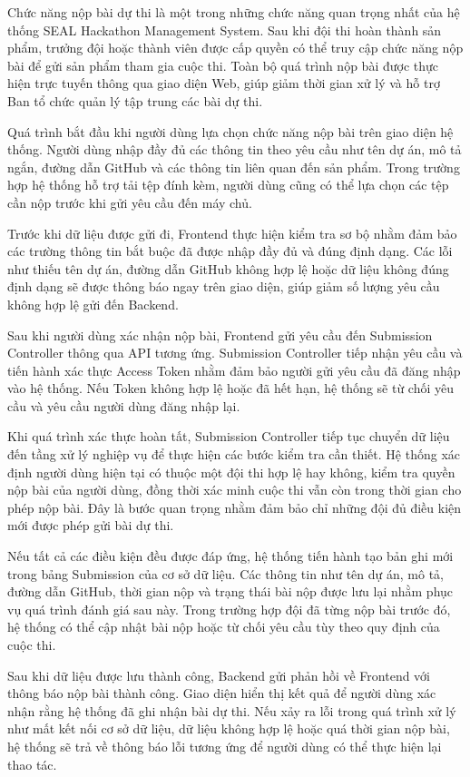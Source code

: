 Chức năng nộp bài dự thi là một trong những chức năng quan trọng nhất của hệ thống SEAL Hackathon Management System. Sau khi đội thi hoàn thành sản phẩm, trưởng đội hoặc thành viên được cấp quyền có thể truy cập chức năng nộp bài để gửi sản phẩm tham gia cuộc thi. Toàn bộ quá trình nộp bài được thực hiện trực tuyến thông qua giao diện Web, giúp giảm thời gian xử lý và hỗ trợ Ban tổ chức quản lý tập trung các bài dự thi.

Quá trình bắt đầu khi người dùng lựa chọn chức năng nộp bài trên giao diện hệ thống. Người dùng nhập đầy đủ các thông tin theo yêu cầu như tên dự án, mô tả ngắn, đường dẫn GitHub và các thông tin liên quan đến sản phẩm. Trong trường hợp hệ thống hỗ trợ tải tệp đính kèm, người dùng cũng có thể lựa chọn các tệp cần nộp trước khi gửi yêu cầu đến máy chủ.

Trước khi dữ liệu được gửi đi, Frontend thực hiện kiểm tra sơ bộ nhằm đảm bảo các trường thông tin bắt buộc đã được nhập đầy đủ và đúng định dạng. Các lỗi như thiếu tên dự án, đường dẫn GitHub không hợp lệ hoặc dữ liệu không đúng định dạng sẽ được thông báo ngay trên giao diện, giúp giảm số lượng yêu cầu không hợp lệ gửi đến Backend.

Sau khi người dùng xác nhận nộp bài, Frontend gửi yêu cầu đến Submission Controller thông qua API tương ứng. Submission Controller tiếp nhận yêu cầu và tiến hành xác thực Access Token nhằm đảm bảo người gửi yêu cầu đã đăng nhập vào hệ thống. Nếu Token không hợp lệ hoặc đã hết hạn, hệ thống sẽ từ chối yêu cầu và yêu cầu người dùng đăng nhập lại.

Khi quá trình xác thực hoàn tất, Submission Controller tiếp tục chuyển dữ liệu đến tầng xử lý nghiệp vụ để thực hiện các bước kiểm tra cần thiết. Hệ thống xác định người dùng hiện tại có thuộc một đội thi hợp lệ hay không, kiểm tra quyền nộp bài của người dùng, đồng thời xác minh cuộc thi vẫn còn trong thời gian cho phép nộp bài. Đây là bước quan trọng nhằm đảm bảo chỉ những đội đủ điều kiện mới được phép gửi bài dự thi.

Nếu tất cả các điều kiện đều được đáp ứng, hệ thống tiến hành tạo bản ghi mới trong bảng Submission của cơ sở dữ liệu. Các thông tin như tên dự án, mô tả, đường dẫn GitHub, thời gian nộp và trạng thái bài nộp được lưu lại nhằm phục vụ quá trình đánh giá sau này. Trong trường hợp đội đã từng nộp bài trước đó, hệ thống có thể cập nhật bài nộp hoặc từ chối yêu cầu tùy theo quy định của cuộc thi.

Sau khi dữ liệu được lưu thành công, Backend gửi phản hồi về Frontend với thông báo nộp bài thành công. Giao diện hiển thị kết quả để người dùng xác nhận rằng hệ thống đã ghi nhận bài dự thi. Nếu xảy ra lỗi trong quá trình xử lý như mất kết nối cơ sở dữ liệu, dữ liệu không hợp lệ hoặc quá thời gian nộp bài, hệ thống sẽ trả về thông báo lỗi tương ứng để người dùng có thể thực hiện lại thao tác.

